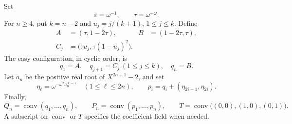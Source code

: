 \documentclass[11pt,a4paper]{article}
\numberwithin{equation}{section}
\theoremstyle{plain}
\newcommand{\eps}{\varepsilon}
\newcommand{\conv}{\operatorname{conv}}
\begin{document}
Set
\begin{equation}\label{poly:ic:eq:scales}
 \eps=\omega^{-1},\qquad \tau=\omega^{-\omega}.
\end{equation}
For $n\geq4$, put $k=n-2$ and $u_j=j/(k+1)$, $1\leq j\leq k$.
Define
\begin{align}
 A&=(\tau,1-2\tau),&B&=(1-2\tau,\tau),\label{poly:ic:eq:AB}\\
 C_j&=\bigl(\tau u_j,\tau(1-u_j)^2\bigr).\label{poly:ic:eq:cap}
\end{align}
The easy configuration, in cyclic order, is
\begin{equation}\label{poly:ic:eq:qpoints}
 q_1=A,\quad q_{j+1}=C_j\ (1\leq j\leq k),\quad q_n=B.
\end{equation}
Let $a_n$ be the positive real root of $X^{2n+1}-2$, and set
\begin{equation}\label{poly:ic:eq:etas}
 \eta_\ell=\omega^{-\omega^2a_n^{\ell-1}}
 \quad(1\leq\ell\leq2n),\qquad
 p_i=q_i+(\eta_{2i-1},\eta_{2i}).
\end{equation}
Finally,
\[
 Q_n=\conv(q_1,\ldots,q_n),\qquad
 P_n=\conv(p_1,\ldots,p_n),\qquad
 T=\conv\bigl((0,0),(1,0),(0,1)\bigr).
\]
A subscript on $\conv$ or $T$ specifies the coefficient field when needed.
\end{document}
